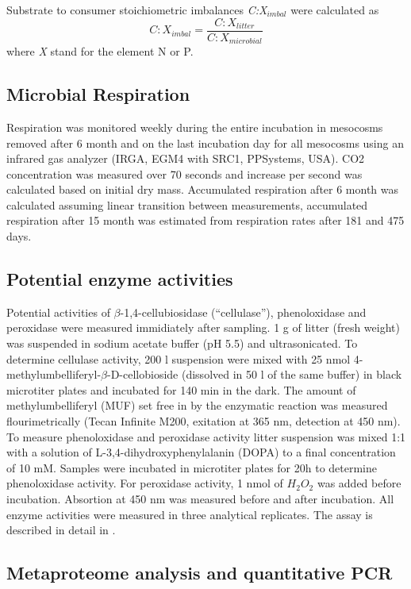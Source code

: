Substrate to consumer stoichiometric imbalances \emph{C:X$_{imbal}$} were calculated as
\begin{equation}
 C:X_{imbal}=\frac{C:X_{litter}}{C:X_{microbial}} \label{eq:imbal}
\end{equation}
where \emph{X} stand for the element N or P.

\subsection*{Microbial Respiration}
Respiration was monitored weekly during the entire incubation in mesocosms removed after 6 month and on the last incubation day for all mesocosms using an infrared gas analyzer (IRGA, EGM4 with SRC1, PPSystems, USA). CO2 concentration was measured over 70 seconds and increase per second was calculated based on initial dry mass. Accumulated respiration after 6 month was calculated assuming linear transition between measurements, accumulated respiration after 15 month was estimated from respiration rates after 181 and 475 days.

\subsection*{Potential enzyme activities}

Potential activities of $\beta$-1,4-cellubiosidase (``cellulase''), phenoloxidase and peroxidase were measured immidiately after sampling. 1 g of litter (fresh weight) was suspended in sodium acetate buffer (pH 5.5) and ultrasonicated. To determine cellulase activity, 200 \textmu l suspension were mixed with 25 nmol 4-methylumbelliferyl-$\beta$-D-cellobioside (dissolved in 50 \textmu l of the same buffer) in black microtiter plates and incubated for 140 min in the dark. The amount of methylumbelliferyl (MUF) set free in by the enzymatic reaction was measured flourimetrically (Tecan Infinite M200, exitation at 365 nm, detection at 450 nm). To measure phenoloxidase and peroxidase activity litter suspension was mixed 1:1 with a solution of L-3,4-dihydroxyphenylalanin (DOPA) to a final concentration of 10 mM. Samples were incubated in microtiter plates for 20h to determine phenoloxidase activity. For peroxidase activity, 1 nmol of $H_2O_2$ was added before incubation. Absortion at 450 nm was measured before and after incubation. All enzyme activities were measured in three analytical replicates. The assay is described in detail in \cite{Kaiser2010b}.

\subsection*{Metaproteome analysis and quantitative PCR}

